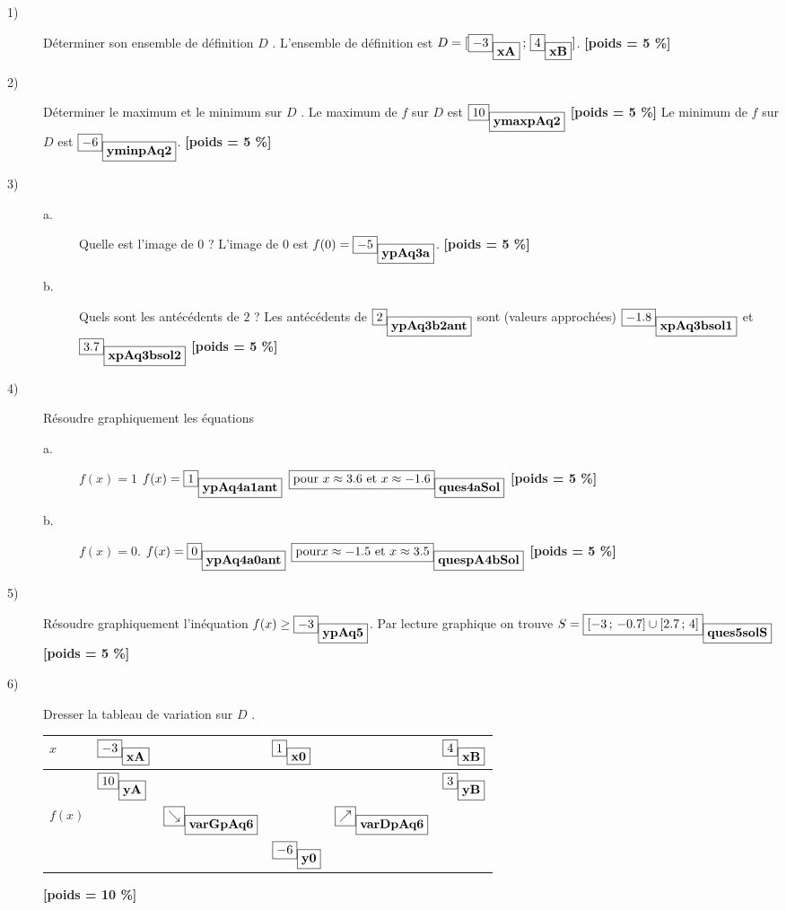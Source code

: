 \documentclass[10pt,a4paper]{article}
\newcommand{\poids}[1]{ {\bf [poids = #1 \%]}}
\newcommand{\var}[2]{\fbox{$#2$}_{\fbox{\mbox{\bf #1}}}}
\begin{document}
\begin{description}
\item[1)] 
Déterminer son ensemble de définition $D$ .
L'ensemble de définition est $D = [\var{xA}{-3}\,;\,\var{xB}{4}]$. \poids{5} %
\item[2)] 
Déterminer le maximum et le minimum sur $D$ .
Le maximum de $f$ sur $D$ est $\var{ymaxpAq2}{10}$ \poids{5} %
Le minimum de $f$ sur $D$ est $\var{yminpAq2}{-6}$.  \poids{5} %
\item[3)]  
\begin{description}
 \item [a.] 
Quelle est l'image de $0$ ?
 L'image de $0$ est $f(0)=\var{ypAq3a}{-5}$. \poids{5} %
 \item[b.] 
Quels sont les antécédents de $2$ ?
 Les antécédents de $\var{ypAq3b2ant}{2}$ sont (valeurs approchées) $\var{xpAq3bsol1}{-1.8}$ et $\var{xpAq3bsol2}{3.7}$ \poids{5} %
\end{description}

\item[4)] 
Résoudre graphiquement les équations 
\begin{description}
\item[a.] 
$f(x) = 1$
$f(x) = \var{ypAq4a1ant}{1}$  $\var{ques4aSol}{\mbox{pour }x\approx 3.6\mbox{ et }x\approx -1.6}$ \poids{5} %
\item[b.] 
$f(x) = 0$.
$f(x) = \var{ypAq4a0ant}{0}$ $\var{quespA4bSol}{\mbox{pour}x\approx -1.5\mbox{ et }x\approx 3.5}$ \poids{5} %
\end{description}

\item[5)]  
Résoudre graphiquement l'inéquation $f(x)\geq \var{ypAq5}{-3}$.
Par lecture graphique on trouve $S =\var{ques5solS}{ [-3\,;\,-0.7] \cup  [2.7\,;\,4]}$ \poids{5} %
\item[6)] 
Dresser la tableau de variation sur $D$ .
\begin{center}
\begin{tabular}{|l|lllll|} \hline
$x$ & $\var{xA}{-3}$ &  & $\var{x0}{1}$ &  & $\var{xB}{4}$\\ \hline
 & $\var{yA}{10}$ &  &  &  & $\var{yB}{3}$\\ 
$f(x)$ &  & $\var{varGpAq6}{\searrow}$ &  & $\var{varDpAq6}{\nearrow}$ & \\
 &  &  & $\var{y0}{-6}$ &  & \\ \hline
\end{tabular}
\end{center}
\poids{10} %
\end{description}
\end{document}
